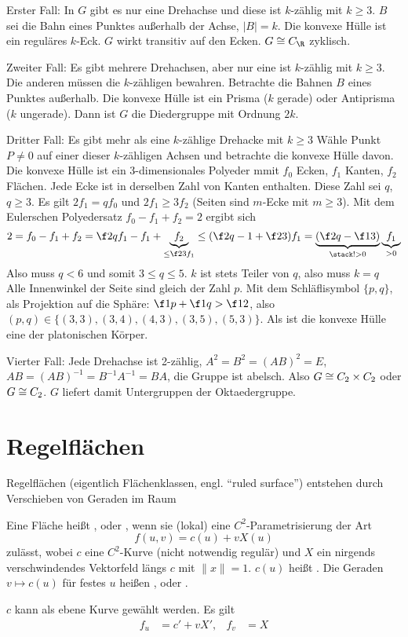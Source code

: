 Erster Fall:
In $G$ gibt es nur eine Drehachse und diese ist $k$-zählig mit $k \ge 3$.
$B$ sei die Bahn eines Punktes außerhalb der Achse, $|B| = k$.
Die konvexe Hülle ist ein reguläres $k$-Eck.
$G$ wirkt transitiv auf den Ecken.
$G \isomorphic C_\R$ zyklisch.

Zweiter Fall:
Es gibt mehrere Drehachsen, aber nur eine ist $k$-zählig mit $k \ge 3$.
Die anderen müssen die $k$-zähligen bewahren.
Betrachte die Bahnen $B$ eines Punktes außerhalb.
Die konvexe Hülle ist ein Prisma ($k$ gerade) oder Antiprisma ($k$ ungerade).
Dann ist $G$ die Diedergruppe mit Ordnung $2k$.

Dritter Fall:
Es gibt mehr als eine $k$-zählige Drehacke mit $k \ge 3$
Wähle Punkt $P \neq 0$ auf einer dieser $k$-zähligen Achsen und betrachte die konvexe Hülle davon.
Die konvexe Hülle ist ein 3-dimensionales Polyeder mmit $f_0$ Ecken, $f_1$ Kanten, $f_2$ Flächen.
Jede Ecke ist in derselben Zahl von Kanten enthalten.
Diese Zahl sei $q$, $q \ge 3$.
Es gilt $2 f_1 = q f_0$ und $2f_1 \ge 3 f_2$ (Seiten sind $m$-Ecke mit $m \ge 3$).
Mit dem Eulerschen Polyedersatz $f_0 - f_1 + f_2 = 2$ ergibt sich
\[
	2 = f_0 - f_1 + f_2
	= \f 2q f_1 - f_1 + \underbrace{f_2}_{\le \f 23 f_1}
	\le (\f 2q - 1 + \f 23) f_1
	= \underbrace{(\f 2q - \f 13)}_{\stack !> 0} \underbrace{f_1}_{> 0}
\]
Also muss $q < 6$ und somit $3 \le q \le 5$.
$k$ ist stets Teiler von $q$, also muss $k = q$
Alle Innenwinkel der Seite sind gleich der Zahl $p$.
Mit dem Schläflisymbol $\{p, q\}$, als Projektion auf die Sphäre: $\f 1p + \f 1q > \f 12$, also $(p,q) \in \{ (3,3), (3,4), (4, 3), (3,5), (5,3) \}$.
Als ist die konvexe Hülle eine der platonischen Körper.

Vierter Fall:
Jede Drehachse ist 2-zählig, $A^2 = B^2 = (AB)^2 = E$, $AB = (AB)^{-1} = B^{-1} A^{-1} = BA$, die Gruppe ist abelsch.
Also $G \cong C_2 \times C_2$ oder $G \cong C_2$.
$G$ liefert damit Untergruppen der Oktaedergruppe.




\section{Regelflächen}


Regelflächen (eigentlich Flächenklassen, engl. “ruled surface”) entstehen durch Verschieben von Geraden im Raum

\begin{df}
	Eine Fläche heißt , oder , wenn sie (lokal) eine $C^2$-Parametrisierung der Art
	\[
		f(u,v) = c(u) + v X(u)
	\]
	zulässt, wobei $c$ eine $C^2$-Kurve (nicht notwendig regulär) und $X$ ein nirgends verschwindendes Vektorfeld längs $c$ mit \oBdA $\|x\| = 1$.
	$c(u)$ heißt .
	Die Geraden $v \mapsto c(u)$ für festes $u$ heißen , oder .
	\begin{note}
		$c$ kann als ebene Kurve gewählt werden.
		Es gilt
		\begin{align*}
			f_u &= c' + vX', &
			f_v &= X
		\end{align*}
	\end{note}
\end{df}

